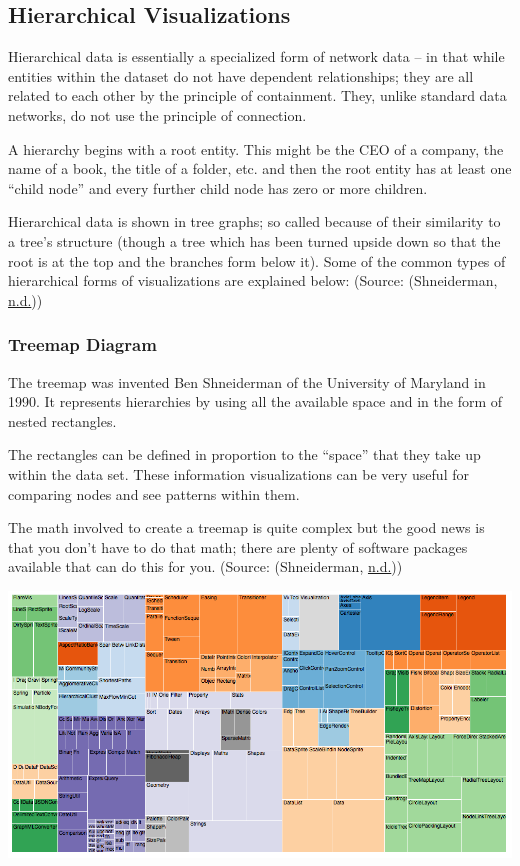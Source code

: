 \documentclass[]{book}
\begin{document}
\hypertarget{hierarchical-visualizations}{%
\subsection{Hierarchical Visualizations}\label{hierarchical-visualizations}}

Hierarchical data is essentially a specialized form of network data -- in that while entities within the dataset do not have dependent relationships; they are all related to each other by the principle of containment. They, unlike standard data networks, do not use the principle of connection.

A hierarchy begins with a root entity. This might be the CEO of a company, the name of a book, the title of a folder, etc. and then the root entity has at least one ``child node'' and every further child node has zero or more children.

Hierarchical data is shown in tree graphs; so called because of their similarity to a tree's structure (though a tree which has been turned upside down so that the root is at the top and the branches form below it). Some of the common types of hierarchical forms of visualizations are explained below:
(Source: (Shneiderman, \protect\hyperlink{ref-tier-chart}{n.d.}))

\hypertarget{treemap-diagram}{%
\subsubsection{Treemap Diagram}\label{treemap-diagram}}

The treemap was invented Ben Shneiderman of the University of Maryland in 1990. It represents hierarchies by using all the available space and in the form of nested rectangles.

The rectangles can be defined in proportion to the ``space'' that they take up within the data set. These information visualizations can be very useful for comparing nodes and see patterns within them.

The math involved to create a treemap is quite complex but the good news is that you don't have to do that math; there are plenty of software packages available that can do this for you.
(Source: (Shneiderman, \protect\hyperlink{ref-tier-chart}{n.d.}))

\includegraphics{images/treemap.png}
\end{document}
